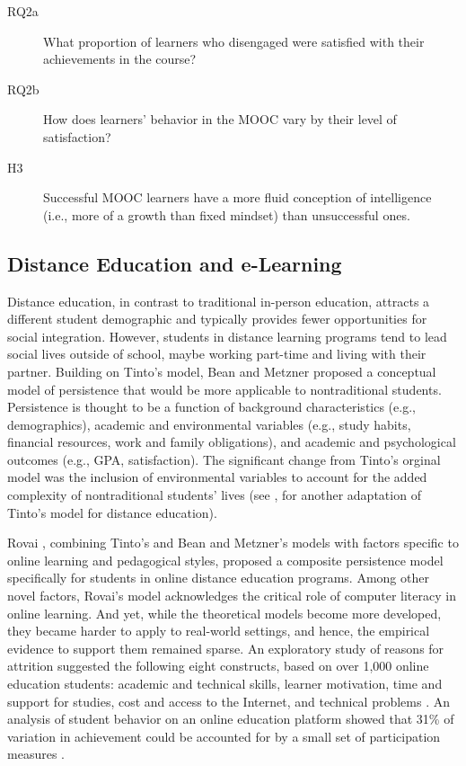 \documentclass{sigchi}\usepackage[]{graphicx}\usepackage[]{color}
\begin{document}
\begin{description}
  \item[RQ2a] What proportion of learners who disengaged were satisfied with their achievements in the course?
  \item[RQ2b] How does learners' behavior in the MOOC vary by their level of satisfaction?
  \item[H3] Successful MOOC learners have a more fluid conception of intelligence (i.e., more of a growth than fixed mindset) than unsuccessful ones.
\end{description}

\subsection{Distance Education and e-Learning}

Distance education, in contrast to traditional in-person education, attracts a different student demographic and typically provides fewer opportunities for social integration. However, students in distance learning programs tend to lead social lives outside of school, maybe working part-time and living with their partner. Building on Tinto's model, Bean and Metzner \citeyear{bean1985conceptual} proposed a conceptual model of persistence that would be more applicable to nontraditional students. Persistence is thought to be a function of background characteristics (e.g., demographics), academic and environmental variables (e.g., study habits, financial resources, work and family obligations), and academic and psychological outcomes (e.g., GPA, satisfaction). The significant change from Tinto's orginal model was the inclusion of environmental variables to account for the added complexity of nontraditional students' lives (see \cite{kember1989longitudinal}, for another adaptation of Tinto's model for distance education).

Rovai \citeyear{rovai2003search}, combining Tinto's and Bean and Metzner's models with factors specific to online learning and pedagogical styles, proposed a composite persistence model specifically for students in online distance education programs. Among other novel factors, Rovai's model acknowledges the critical role of computer literacy in online learning. And yet, while the theoretical models become more developed, they became harder to apply to real-world settings, and hence, the empirical evidence to support them remained sparse. An exploratory study of reasons for attrition suggested the following eight constructs, based on over 1,000 online education students: academic and technical skills, learner motivation, time and support for studies, cost and access to the Internet, and technical problems \cite{muilenburg2005student}. An analysis of student behavior on an online education platform showed that 31\% of variation in achievement could be accounted for by a small set of participation measures \cite{morris2005tracking}.
\end{document}

